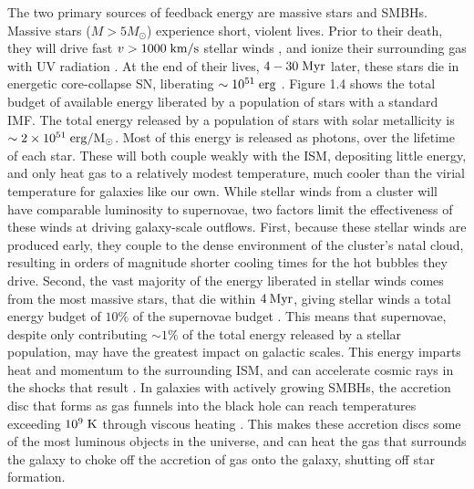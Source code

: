 The two primary sources of feedback energy are massive stars and SMBHs.  Massive
stars ($M>5M_\odot$) experience short, violent lives.  Prior to their death,
they will drive fast $v>1000\;\rm{km/s}$ stellar winds \citep{Weaver1977}, and
ionize their surrounding gas with UV radiation \citep{Krumholz2009}.  At the end
of their lives, $4-30\;\rm{Myr}$ later, these stars die in energetic
core-collapse SN, liberating $\sim10^{51}\;\rm{erg}$
\citep{Wilson1985,Bethe1990}.  Figure 1.4 shows the total budget of available
energy liberated by a population of stars with a standard \citet{Chabrier2003}
IMF.  The total energy released by a population of stars with solar metallicity is
$\sim 2\times10^{51}\;\rm{erg/M_\odot}$.  Most of this energy is released as
photons, over the lifetime of each star.  These will both couple weakly with the
ISM, depositing little energy, and only heat gas to a relatively modest
temperature, much cooler than the virial temperature for galaxies like our own.
While stellar winds from a cluster will have comparable luminosity to
supernovae, two factors limit the effectiveness of these winds at driving
galaxy-scale outflows.  First, because these stellar winds are produced early,
they couple to the dense environment of the cluster's natal cloud, resulting in
orders of magnitude shorter cooling times for the hot bubbles they drive.
Second, the vast majority of the energy liberated in stellar winds comes from
the most massive stars, that die within $4\>{\rm Myr}$, giving stellar winds a total
energy budget of $10\%$ of the supernovae budget \citet{Leitherer1999}.
This means that supernovae, despite only contributing $\sim1\%$ of the total
energy released by a stellar population, may have the greatest impact on
galactic scales.  This energy imparts heat and momentum to the surrounding ISM,
and can accelerate cosmic rays in the shocks that result \citep{Bell1978}.  In
galaxies with actively growing SMBHs, the accretion disc that forms as gas
funnels into the black hole can reach temperatures exceeding $10^9\;\rm{K}$
through viscous heating \citep{Antonucci1993}.  This makes these accretion discs
some of the most luminous objects in the universe, and can heat the gas that
surrounds the galaxy to choke off the accretion of gas onto the galaxy, shutting
off star formation.


